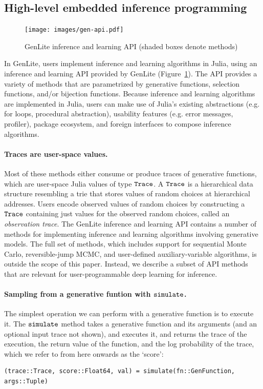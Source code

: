 \subsection{High-level embedded inference programming}

\begin{figure}[t]
\centering
    \texttt{[image: images/gen-api.pdf]}
    \caption{GenLite inference and learning API (shaded boxes denote methods)}
    \label{fig:genlite-api}
\end{figure}

In GenLite, users implement inference and learning algorithms in Julia, using an inference and learning API provided by GenLite (Figure~\ref{fig:genlite-api}).
The API provides a variety of methods that are parametrized by generative functions, selection functions, and/or bijection functions.
Because inference and learning algorithms are implemented in Julia, users can make use of Julia's existing abstractions (e.g. for loops, procedural abstraction), usability features (e.g. error messages, profiler), package ecosystem, and foreign interfaces to compose inference algorithms.

\paragraph{Traces are user-space values.} Most of these methods either consume or produce traces of generative functions, which are user-space Julia values of type $\mbox{\texttt{Trace}}$.
A $\mbox{\texttt{Trace}}$ is a hierarchical data structure resembling a trie that stores values of random choices at hierarchical addresses.
Users encode observed values of random choices by constructing a $\mbox{\texttt{Trace}}$ containing just values for the observed random choices, called an \emph{observation trace}.
The GenLite inference and learning API contains a number of methods for implementing inference and learning algorithms involving generative models.
The full set of methods, which includes support for sequential Monte Carlo, reversible-jump MCMC, and user-defined auxiliary-variable algorithms, is outside the scope of this paper.
Instead, we describe a subset of API methods that are relevant for user-programmable deep learning for inference.

\paragraph{Sampling from a generative funtion with $\mbox{\texttt{simulate}}$.}
The simplest operation we can perform with a generative function is to execute it.
The $\mbox{\texttt{simulate}}$ method takes a generative function and its arguments (and an optional input trace not shown), and executes it, and returns the trace of the execution, the return value of the function, and the log probability of the trace, which we refer to from here onwards as the `score':
\begin{verbatim}
(trace::Trace, score::Float64, val) = simulate(fn::GenFunction, args::Tuple)
\end{verbatim}

